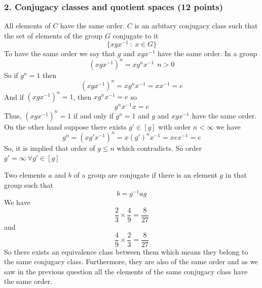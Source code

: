 \documentclass[12pt]{article}
\newcounter{alplisti}
\renewcommand{\thealplisti}{\alph{alplisti}}
\newenvironment{alplist}[1][(\thealplisti)]{\begin{list}{{\rm #1}\ }{ %
      \usecounter{alplisti} %
    \setlength{\itemsep}{0pt}
    \setlength{\parsep}{0pt}  %
     \setlength{\topsep}{0pt} %
}}{\end{list}}
\begin{document}
\newpage
 
\subsubsection*{2. Conjugacy classes and quotient spaces (12 points)}

\begin{alplist}
\item All elements of $C$ have the same order. $C$ is an arbitary conjugacy class such that the set of elements of the group $G$ conjugate to it
$$ \{ xgx^{-1} \ : \ x \in G \}$$
To have the same order we say that $g$ and $xgx^{-1}$ have the same order. In a group 
$$ (xgx^{-1})^n = x g^n x^{-1} \ \ n >0$$ 
So if $g^n =1$ then 
$$ (xgx^{-1})^n = xg^n x^{-1} = xx^{-1} = e$$ 
And if $(xgx^{-1})^n =1$, then $xg^n x^{-1} = e$ so 
$$ g^n x^{-1} x = e$$ 
Thus, $(xgx^{-1})^n =1$ if and only if $g^n =1$ and $g$ and $xgx^{-1}$ have the same order. \\
On the other hand suppose there exists $g' \in [g]$ with order $n < \infty$ we have 
$$ g^n = (xg'x^{-1})^n = x(g')^n x^{-1} = xex^{-1} = e $$ 
So, it is implied that order of $g \leq n$ which contradicts. So order $g' = \infty \ \forall g' \in [g]$

\item Two elements $a$ and $b$ of a group are conjugate if there is an element $g$ in that group such that 
$$ b = g^{-1} a g $$
We have 
$$ \frac{2}{3} \times \frac{4}{9} = \frac{8}{27} $$
and 
$$ \frac{4}{9} \times \frac{2}{3} = \frac{8}{27} $$
So there exists an equivalence class between them which means they belong to the same conjugacy class. Furthermore, they are also of the same order and as we saw in the previous question all the elements of the same conjugacy class have the same order. 
\\


\end{alplist}
\end{document}

